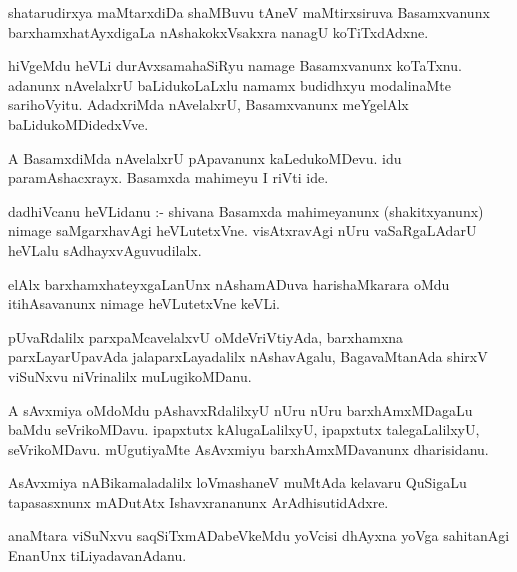 \documentclass{article}
\begin{document}
\begin{mn}
shatarudirxya  maMtarxdiDa  shaMBuvu  tAneV  maMtirxsiruva  Basamxvanunx  barxhamxhatAyxdigaLa  
nAshakokxVsakxra  nanagU  koTiTxdAdxne.
\end{mn}

\begin{mn}
hiVgeMdu  heVLi  durAvxsamahaSiRyu  namage  Basamxvanunx  koTaTxnu.  adanunx  nAvelalxrU  baLidukoLaLxlu  
namamx  budidhxyu  modalinaMte  sarihoVyitu.  AdadxriMda  nAvelalxrU,  Basamxvanunx  meYgelAlx  baLidukoMDidedxVve.
\end{mn}

\begin{mn}
A  BasamxdiMda  nAvelalxrU  pApavanunx  kaLedukoMDevu.  idu  paramAshacxrayx.  Basamxda  mahimeyu  I riVti  ide.
\end{mn}

\begin{mn}
dadhiVcanu  heVLidanu :- shivana  Basamxda  mahimeyanunx  (shakitxyanunx) nimage  saMgarxhavAgi  heVLutetxVne.  
visAtxravAgi  nUru  vaSaRgaLAdarU  heVLalu  sAdhayxvAguvudilalx.
\end{mn}

\begin{mn}
elAlx  barxhamxhateyxgaLanUnx  nAshamADuva  harishaMkarara  oMdu  itihAsavanunx  nimage  heVLutetxVne  keVLi.
\end{mn}

\begin{mn}
pUvaRdalilx  parxpaMcavelalxvU  oMdeVriVtiyAda,  barxhamxna  parxLayarUpavAda  jalaparxLayadalilx  nAshavAgalu,  
BagavaMtanAda  shirxV viSuNxvu  niVrinalilx  muLugikoMDanu.
\end{mn}

\begin{mn}
A  sAvxmiya  oMdoMdu  pAshavxRdalilxyU  nUru  nUru  barxhAmxMDagaLu  baMdu  seVrikoMDavu.  ipapxtutx  kAlugaLalilxyU,  
ipapxtutx talegaLalilxyU,  seVrikoMDavu.  mUgutiyaMte  AsAvxmiyu  barxhAmxMDavanunx  dharisidanu.
\end{mn}

\begin{mn}
AsAvxmiya  nABikamaladalilx  loVmashaneV  muMtAda  kelavaru  QuSigaLu  tapasasxnunx  mADutAtx  Ishavxrananunx  
ArAdhisutidAdxre.
\end{mn}

\begin{mn}
anaMtara  viSuNxvu  saqSiTxmADabeVkeMdu  yoVcisi  dhAyxna  yoVga  sahitanAgi  EnanUnx  tiLiyadavanAdanu.
\end{mn}
\end{document}
